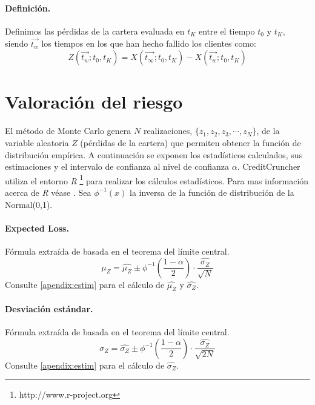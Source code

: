 \paragraph{Definici\'on.} Definimos las p\'erdidas de la cartera evaluada en $t_K$
entre el tiempo $t_0$ y $t_K$, siendo $\vec{t_w}$ los tiempos en los que han hecho
fallido los clientes como:
\begin{equation}
Z(\vec{t_w};t_0,t_K) = X(\vec{t_\infty};t_0,t_K) - X(\vec{t_w};t_0,t_K)
\end{equation}


\section{Valoraci\'on del riesgo}
\label{res:risk}

El m\'etodo de Monte Carlo genera $N$ realizaciones, $\{z_1,z_2,z_3,\cdots,z_N\}$,
de la variable aleatoria $Z$ (p\'erdidas de la cartera) que permiten obtener la
funci\'on de distribuci\'on emp\'irica. A continuaci\'on se exponen los estad\'isticos
calculados, sus estimaciones y el intervalo de confianza al nivel de confianza $\alpha$.
CreditCruncher utiliza el entorno \emph{R} \footnote{http://www.r-project.org} para realizar
los c\'alculos estad\'isticos. Para mas informaci\'on acerca de \emph{R} v\'ease \cite{stats:R}.
Sea $\phi^{-1}(x)$ la inversa de la funci\'on de distribuci\'on de la Normal(0,1).

\paragraph{Expected Loss.} F\'ormula extra\'ida de \cite{stats:schaum}
basada en el teorema del l\'imite central.
\begin{displaymath}
\mu_Z = \widehat{\mu_Z} \pm \phi^{-1}\left(\frac{1-\alpha}{2}\right) \cdot \frac{\widehat{\sigma_Z}}{\sqrt{N}}
\end{displaymath}
Consulte \ref{apendix:estim} para el c\'alculo de $\widehat{\mu_Z}$ y $\widehat{\sigma_Z}$.

\paragraph{Desviaci\'on est\'andar.} F\'ormula extra\'ida de
\cite{stats:schaum} basada en el teorema del l\'imite central.
\begin{displaymath}
\sigma_Z = \widehat{\sigma_Z} \pm \phi^{-1}\left(\frac{1-\alpha}{2}\right) \cdot \frac{\widehat{\sigma_Z}}{\sqrt{2N}}
\end{displaymath}
Consulte \ref{apendix:estim} para el c\'alculo de $\widehat{\sigma_Z}$.

